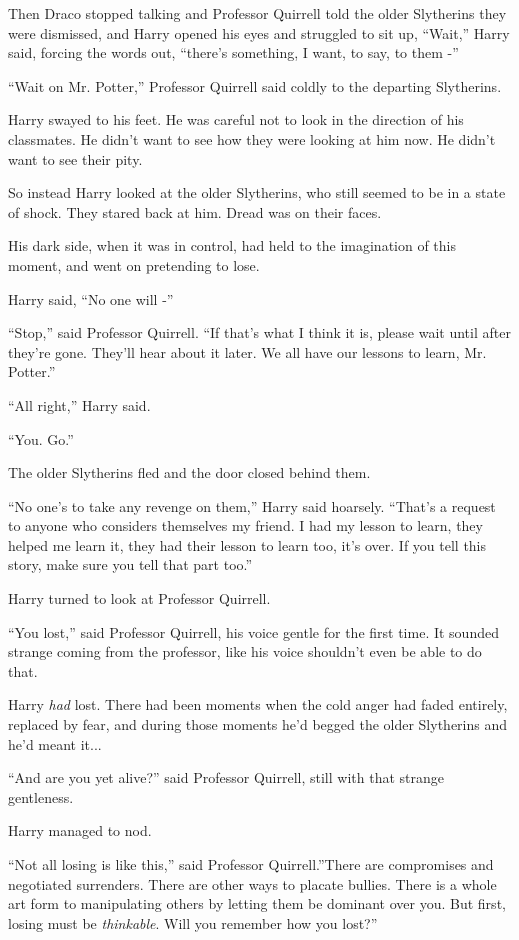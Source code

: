 Then Draco stopped talking and Professor Quirrell told the older
Slytherins they were dismissed, and Harry opened his eyes and struggled
to sit up, ``Wait,'' Harry said, forcing the words out, ``there's
something, I want, to say, to them -''

``Wait on Mr. Potter,'' Professor Quirrell said coldly to the departing
Slytherins.

Harry swayed to his feet. He was careful not to look in the direction of
his classmates. He didn't want to see how they were looking at him now.
He didn't want to see their pity.

So instead Harry looked at the older Slytherins, who still seemed to be
in a state of shock. They stared back at him. Dread was on their faces.

His dark side, when it was in control, had held to the imagination of
this moment, and went on pretending to lose.

Harry said, ``No one will -''

``Stop,'' said Professor Quirrell. ``If that's what I think it is,
please wait until after they're gone. They'll hear about it later. We
all have our lessons to learn, Mr. Potter.''

``All right,'' Harry said.

``You. Go.''

The older Slytherins fled and the door closed behind them.

``No one's to take any revenge on them,'' Harry said hoarsely. ``That's
a request to anyone who considers themselves my friend. I had my lesson
to learn, they helped me learn it, they had their lesson to learn too,
it's over. If you tell this story, make sure you tell that part too.''

Harry turned to look at Professor Quirrell.

``You lost,'' said Professor Quirrell, his voice gentle for the first
time. It sounded strange coming from the professor, like his voice
shouldn't even be able to do that.

Harry \emph{had} lost. There had been moments when the cold anger had
faded entirely, replaced by fear, and during those moments he'd begged
the older Slytherins and he'd meant it...

``And are you yet alive?'' said Professor Quirrell, still with that
strange gentleness.

Harry managed to nod.

``Not all losing is like this,'' said Professor Quirrell.''There are
compromises and negotiated surrenders. There are other ways to placate
bullies. There is a whole art form to manipulating others by letting
them be dominant over you. But first, losing must be \emph{thinkable}.
Will you remember how you lost?''

